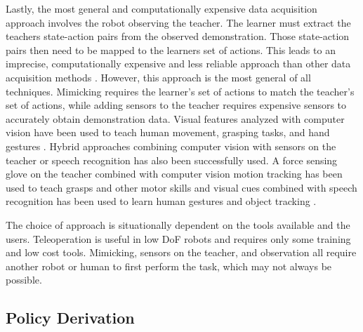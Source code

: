 \documentclass{article}
\begin{document}
Lastly, the most general and computationally expensive data acquisition approach involves the robot observing the teacher. The learner must extract the teachers state-action pairs from the observed demonstration. Those state-action pairs then need to be mapped to the learners set of actions. This leads to an imprecise, computationally expensive and less reliable approach than other data acquisition methods \cite{Argall:2009:SRL:1523530.1524008}. However, this approach is the most general of all techniques. Mimicking requires the learner's set of actions to match the teacher's set of actions, while adding sensors to the teacher requires expensive sensors to accurately obtain demonstration data. Visual features analyzed with computer vision have been used to teach human movement, grasping tasks, and hand gestures \cite{A_programmingfull-body, 1011867,Billard01learninghuman}. Hybrid approaches combining computer vision with sensors on the teacher or speech recognition has also been successfully used. A force sensing glove on the teacher combined with computer vision motion tracking has been used to teach grasps and other motor skills \cite{1442131, 1430829, Voyles01amulti-agent} and visual cues combined with speech recognition has been used to learn human gestures and object tracking \cite{Demiris05hierarchicalattentive, SteilRoethlingHaschkeRitter2004-SRL}. 

The choice of approach is situationally dependent on the tools available and the users. Teleoperation is useful in low DoF robots and requires only some training and low cost tools. Mimicking, sensors on the teacher, and observation all require another robot or human to first perform the task, which may not always be possible.  


\subsection{Policy Derivation} \label{sec:Policy Derivation}
\end{document}
